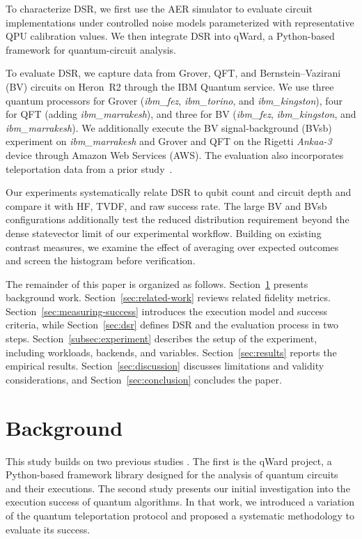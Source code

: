 \documentclass[pdflatex,sn-mathphys-num]{sn-jnl}
\theoremstyle{thmstyleone}%
\theoremstyle{thmstyletwo}%
\theoremstyle{thmstylethree}%
\begin{document}
To characterize DSR, we first use the AER simulator to evaluate circuit implementations under controlled noise models parameterized with representative QPU calibration values. We then integrate DSR into qWard, a Python-based framework for quantum-circuit analysis.

To evaluate DSR, we capture data from Grover, QFT, and Bernstein--Vazirani (BV) circuits on Heron~R2 through the IBM Quantum service. We use three quantum processors for Grover (\textit{ibm\_fez}, \textit{ibm\_torino}, and \textit{ibm\_kingston}), four for QFT (adding \textit{ibm\_marrakesh}), and three for BV (\textit{ibm\_fez}, \textit{ibm\_kingston}, and \textit{ibm\_marrakesh}). We additionally execute the BV signal-background (BVsb) experiment on \textit{ibm\_marrakesh} and Grover and QFT on the Rigetti \textit{Ankaa-3} device through Amazon Web Services (AWS). The evaluation also incorporates teleportation data from a prior study~\cite{vTPMarquez_2026}.

Our experiments systematically relate DSR to qubit count and circuit depth and compare it with HF, TVDF, and raw success rate. The large BV and BVsb configurations additionally test the reduced distribution requirement beyond the dense statevector limit of our experimental workflow. Building on existing contrast measures, we examine the effect of averaging over expected outcomes and screen the histogram before verification.

The remainder of this paper is organized as follows. Section~\ref{sec:background} presents background work. Section~\ref{sec:related-work} reviews related fidelity metrics. Section~\ref{sec:measuring-success} introduces the execution model and success criteria, while Section~\ref{sec:dsr} defines DSR and the evaluation process in two steps. Section~\ref{subsec:experiment} describes the setup of the experiment, including workloads, backends, and variables. Section~\ref{sec:results} reports the empirical results. Section~\ref{sec:discussion} discusses limitations and validity considerations, and Section~\ref{sec:conclusion} concludes the paper.

\FloatBarrier
\section{Background}\label{sec:background}

This study builds on two previous studies \cite{qward2026, vTPMarquez_2026}. The first is the qWard project, a Python-based framework library designed for the analysis of quantum circuits and their executions. The second study presents our initial investigation into the execution success of quantum algorithms. In that work, we introduced a variation of the quantum teleportation protocol and proposed a systematic methodology to evaluate its success.
\end{document}
